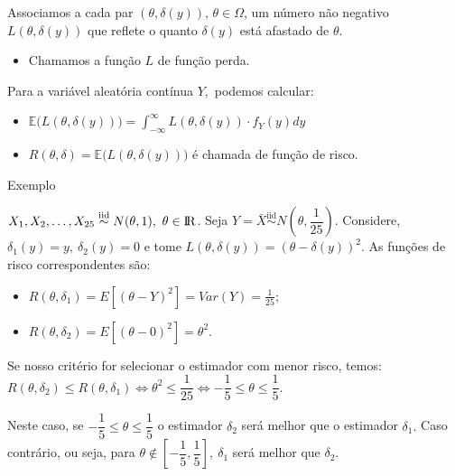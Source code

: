 \documentclass[12pt]{beamer}
\begin{document}
\begin{frame}{}
\begin{block}{}
\justifying
Associamos a cada par $(\theta, \delta(y))$, $\theta \in \Omega$, um número não negativo $L(\theta, \delta(y))$ que reflete o quanto $\delta(y)$ está afastado de $\theta.$ 
\begin{itemize}
    \item Chamamos a função $L$ de função perda. 
\end{itemize}
\end{block}
\pause
\begin{block}{}
Para a variável aleatória contínua $Y,$ podemos calcular:
\begin{itemize}
    \item $\mathbb{E}\Big({L(\theta, \delta(y))}\Big) = \int_{-\infty}^{\infty} L(\theta, \delta(y)) \cdot f_Y(y)dy$
    \item $R(\theta, \delta) =\mathbb{E}\Big({L(\theta, \delta(y))}\Big)$ é chamada de função de risco.
\end{itemize}
\end{block}
\end{frame}

\begin{frame}{Exemplo}
\begin{block}{}
\justifying
$X_1, X_2, \ldots, X_{25}\overset{\text{iid}}{\sim} N(\theta, 1), ~ \theta \in \rm I\!R$. Seja $Y = \bar{X}\overset{\text{iid}}{\sim} N(\theta, \dfrac{1}{25}).$ Considere, $\delta_1(y) = y, ~\delta_2(y) = 0$ e tome $L(\theta, \delta(y)) = (\theta - \delta(y))^2.$ As funções de risco correspondentes são:
\begin{itemize}
    \item $R(\theta, \delta_1) = E[(\theta - Y)^2] = Var(Y) = \frac{1}{25};$
    \item $R(\theta, \delta_2) = E[(\theta - 0)^2] = \theta^2$.
\end{itemize}
\end{block}
\pause
\begin{block}{}
\justifying
Se nosso critério for selecionar o estimador com menor risco, temos:
$R(\theta, \delta_2)\leq R(\theta, \delta_1) \iff \theta^2\leq \dfrac{1}{25}\iff -\dfrac{1}{5}\leq \theta \leq \dfrac{1}{5}.$
\end{block}
\pause
\begin{block}{}
\justifying
Neste caso, se $-\dfrac{1}{5}\leq \theta \leq \dfrac{1}{5}$ o estimador $\delta_{2}$ será melhor que o estimador $\delta_{1}.$ Caso contrário, ou seja, para $\theta \not \in [-\dfrac{1}{5},\dfrac{1}{5}],~\delta_{1} $ será melhor que $\delta_{2}.$
\end{block}
\end{frame}
\end{document}
